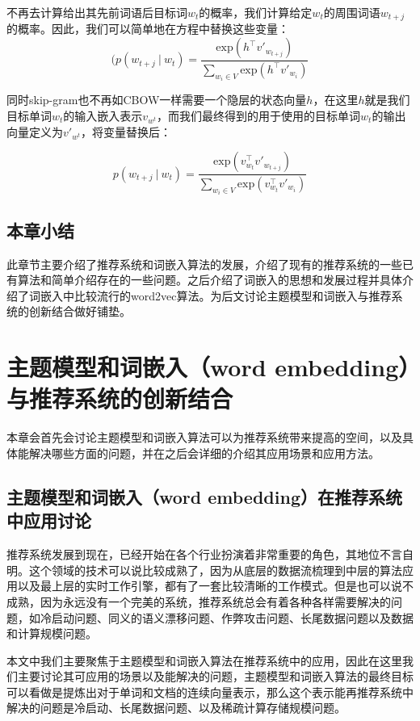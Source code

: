 不再去计算给出其先前词语后目标词$w_t$的概率，我们计算给定$w_t$的周围词语$w_{t + j}$的概率。因此，我们可以简单地在方程中替换这些变量：
\begin{equation}
(p(w_{t+j} \: | \: w_t ) = \dfrac{\text{exp}({h^\top v'_{w_{t+j}}})}{\sum_{w_i \in V} \text{exp}({h^\top v'_{w_i}})}	
\end{equation}

同时skip-gram也不再如CBOW一样需要一个隐层的状态向量$h$，在这里$h$就是我们目标单词$w_t$的输入嵌入表示$v_{w^t}$，而我们最终得到的用于使用的目标单词$w_t$的输出向量定义为$v'_{w^t}$，将变量替换后：

\begin{equation}
p(w_{t+j} \: | \: w_t ) = \dfrac{\text{exp}({v^\top_{w_t} v'_{w_{t+j}}})}{\sum_{w_i \in V} \text{exp}({v^\top_{w_t} v'_{w_i}})}	
\end{equation}
\section{本章小结}
此章节主要介绍了推荐系统和词嵌入算法的发展，介绍了现有的推荐系统的一些已有算法和简单介绍存在的一些问题。之后介绍了词嵌入的思想和发展过程并具体介绍了词嵌入中比较流行的word2vec算法。为后文讨论主题模型和词嵌入与推荐系统的创新结合做好铺垫。
\chapter{主题模型和词嵌入（word embedding）与推荐系统的创新结合}
本章会首先会讨论主题模型和词嵌入算法可以为推荐系统带来提高的空间，以及具体能解决哪些方面的问题，并在之后会详细的介绍其应用场景和应用方法。
\section{主题模型和词嵌入（word embedding）在推荐系统中应用讨论}
推荐系统发展到现在，已经开始在各个行业扮演着非常重要的角色，其地位不言自明。这个领域的技术可以说比较成熟了，因为从底层的数据流梳理到中层的算法应用以及最上层的实时工作引擎，都有了一套比较清晰的工作模式。但是也可以说不成熟，因为永远没有一个完美的系统，推荐系统总会有着各种各样需要解决的问题，如冷启动问题\cite{Schafer2007}、同义的语义漂移问题\cite{synonymy}、作弊攻击问题\cite{shillingattacks}、长尾数据问题\cite{Longtail}以及数据和计算规模问题。

本文中我们主要聚焦于主题模型和词嵌入算法在推荐系统中的应用，因此在这里我们主要讨论其可应用的场景以及能解决的问题，主题模型和词嵌入算法的最终目标可以看做是提炼出对于单词和文档的连续向量表示，那么这个表示能再推荐系统中解决的问题是冷启动、长尾数据问题、以及稀疏计算存储规模问题。

